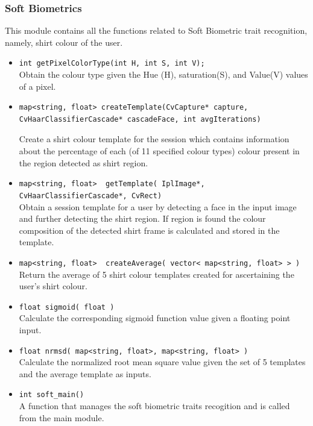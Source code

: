 \documentclass[12pt]{article}			%
\begin{document}
\subsubsection { Soft Biometrics }
This module contains all the functions related to Soft Biometric trait recognition, namely, shirt colour of the user.

\begin{itemize}
\item
\verb+int getPixelColorType(int H, int S, int V);+\\
Obtain the colour type given the Hue (H), saturation(S), and Value(V) values of a pixel.

\item
\begin{verbatim}
map<string, float> createTemplate(CvCapture* capture,
CvHaarClassifierCascade* cascadeFace, int avgIterations)
\end{verbatim}
Create a shirt colour template for the session which contains information about the percentage of each (of 11 specified colour types) colour present in the region detected as shirt region.
\item
\verb+map<string, float>  getTemplate( IplImage*, CvHaarClassifierCascade*, CvRect)+\\
Obtain a session template for a user by detecting a face in the input image and further detecting the shirt region. If region is found the colour composition of the detected shirt frame is calculated and stored in the template.

\item
\verb+map<string, float>  createAverage( vector< map<string, float> > )+\\
Return the average of 5 shirt colour templates created for ascertaining the user's shirt colour. 

\item
\verb+float sigmoid( float )+\\
Calculate the corresponding sigmoid function value given a floating point input. 

\item
\verb+float nrmsd( map<string, float>, map<string, float> )+\\
Calculate the normalized root mean square value given the set of 5 templates and the average template as inputs. 

\item
\verb+int soft_main()+\\
A function that manages the soft biometric traits recogition and is called from the main module.
\end{itemize}
\end{document}
